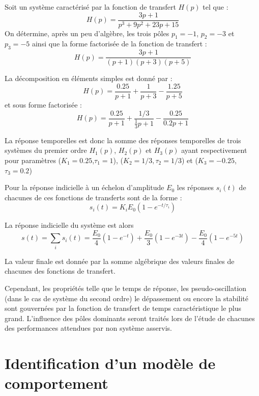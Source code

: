 Soit un système caractérisé par la fonction de transfert $H(p)$ tel
que :
$$
H(p)=\dfrac{3p+1}{p^3+9p^2+23p+15}
$$
On détermine, après un peu d'algèbre, les trois pôles 
$p_1=-1$, $p_2=-3$ et $p_3=-5$ ainsi que la forme factorisée de la fonction 
de transfert :
$$
H(p)=\dfrac{3p+1}{(p+1)(p+3)(p+5)}
$$

La décomposition en éléments simples est donné par :
$$
H(p)=\dfrac{0.25}{p+1}+\dfrac{1}{p+3}-\dfrac{1.25}{p+5}
$$
et sous forme factorisée :
$$
H(p)=\dfrac{0.25}{p+1}+\dfrac{1/3}{\frac{1}{3}p+1}-\dfrac{0.25}{0.2p+1}
$$

La réponse temporelles est donc la somme des réponses temporelles de trois 
systèmes du premier ordre $H_1(p)$, $H_2(p)$ et $H_3(p) $ ayant 
respectivement pour paramètres ($K_1=0.25$,$\tau_1=1$), 
($K_2=1/3,$$\tau_2=1/3$) et ($K_3=-0.25$,$\tau_3=0.2$)

Pour la réponse indicielle à un échelon d'amplitude $E_0$ les 
réponses $s_i(t)$ de chacunes de ces fonctions de transferts sont de la 
forme :
$$
s_i(t)=K_iE_0\left(1-e^{-t/\tau_i}\right)
$$

La réponse indicielle du système est alors
$$
s(t)=\sum_i s_i(t) = 
\dfrac{E_0}{4}\left(1-e^{-t}\right)+
\dfrac{E_0}{3}\left(1-e^{-3t}\right)-
\dfrac{E_0}{4}\left(1-e^{-5t}\right)
$$

La valeur finale est donnée par la somme algébrique des valeurs finales de 
chacunes des fonctions de transfert.

Cependant, les propriétés telle que le temps de réponse, 
les pseudo-oscillation (dans le cas de système du second ordre) 
le dépassement ou encore la stabilité sont gouvernées 
par la fonction de transfert de temps caractéristique le plus grand. 
L'influence des pôles dominants seront traités lors de l'étude 
de chacunes des performances attendues par non système asservis.

\newpage

\section{Identification d'un modèle de comportement}

